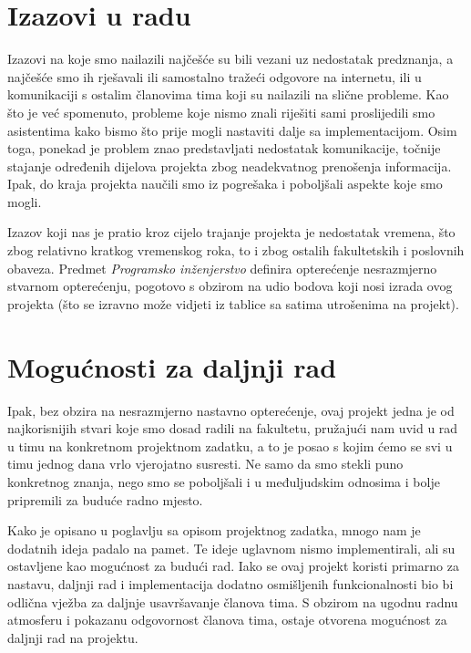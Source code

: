 		\section{Izazovi u radu}
		\par{
		    Izazovi na koje smo nailazili najčešće su bili vezani uz nedostatak predznanja, a najčešće smo ih rješavali ili samostalno tražeći odgovore na internetu, ili u komunikaciji s ostalim članovima tima koji su nailazili na slične probleme. Kao što je već spomenuto, probleme koje nismo znali riješiti sami proslijedili smo asistentima kako bismo što prije mogli nastaviti dalje sa implementacijom. Osim toga, ponekad je problem znao predstavljati nedostatak komunikacije, točnije stajanje određenih dijelova projekta zbog neadekvatnog prenošenja informacija. Ipak, do kraja projekta naučili smo iz pogrešaka i poboljšali aspekte koje smo mogli.
		}
		\par{
		    Izazov koji nas je pratio kroz cijelo trajanje projekta je nedostatak vremena, što zbog relativno kratkog vremenskog roka, to i zbog ostalih fakultetskih i poslovnih obaveza. Predmet \textit{Programsko inženjerstvo} definira opterećenje nesrazmjerno stvarnom opterećenju, pogotovo s obzirom na udio bodova koji nosi izrada ovog projekta (što se izravno može vidjeti iz tablice sa satima utrošenima na projekt).
		}
		\section{Mogućnosti za daljnji rad}
		\par{
		    Ipak, bez obzira na nesrazmjerno nastavno opterećenje, ovaj projekt jedna je od najkorisnijih stvari koje smo dosad radili na fakultetu, pružajući nam uvid u rad u timu na konkretnom projektnom zadatku, a to je posao s kojim ćemo se svi u timu jednog dana vrlo vjerojatno susresti. Ne samo da smo stekli puno konkretnog znanja, nego smo se poboljšali i u međuljudskim odnosima i bolje pripremili za buduće radno mjesto.
		}
		\par{
		    Kako je opisano u poglavlju sa opisom projektnog zadatka, mnogo nam je dodatnih ideja padalo na pamet. Te ideje uglavnom nismo implementirali, ali su ostavljene kao mogućnost za budući rad. Iako se ovaj projekt koristi primarno za nastavu, daljnji rad i implementacija dodatno osmišljenih funkcionalnosti bio bi odlična vježba za daljnje usavršavanje članova tima. S obzirom na ugodnu radnu atmosferu i pokazanu odgovornost članova tima, ostaje otvorena mogućnost za daljnji rad na projektu.
		}
		
		\eject 